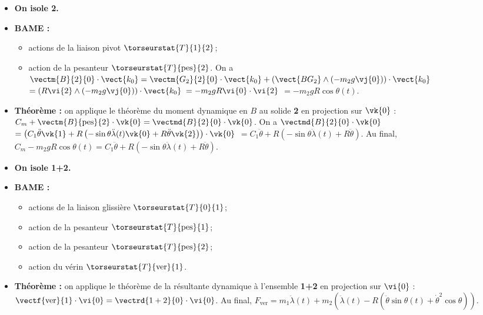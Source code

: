 \begin{corrigebox}
\begin{itemize}
\item \textbf{On isole 2.}
\item \textbf{BAME :}
\begin{itemize}
\item actions de la liaison pivot $\torseurstat{T}{1}{2}$; 
\item action de la pesanteur $\torseurstat{T}{\text{pes}}{2}$. On a $\vectm{B}{2}{0}\cdot \vect{k_0}=\vectm{G_2}{2}{0}\cdot \vect{k_0}+\left(\vect{BG_2}\wedge \left( -m_2 g \vj{0} \right) \right)\cdot \vect{k_0}$ $=\left(R\vi{2}\wedge \left( -m_2 g \vj{0} \right) \right)\cdot \vect{k_0}$
$=-m_2 g R  \vi{0}\cdot \vi{2} $ $=-m_2 g R  \cos\theta(t) $.
\end{itemize}
\item \textbf{Théorème :} on applique le théorème du moment dynamique en $B$ au solide \textbf{2} en projection sur $\vk{0}$ : $C_m+\vectm{B}{\text{pes}}{2}\cdot \vk{0}  = \vectmd{B}{2}{0}\cdot \vk{0}$.
On  a $ \vectmd{B}{2}{0}\cdot \vk{0}$ $=\left(C_1  \ddot{\theta} \vk{1} + R\left( -\sin \theta \ddot{\lambda}(t) \vk{0} 
+ R \ddot{\theta} \vk{2}\right) \right) \cdot \vk{0}$
 $=C_1  \ddot{\theta} + R\left( -\sin \theta \ddot{\lambda}(t) + R \ddot{\theta} \right)  $. Au final, 
 $ C_m-m_2 g R  \cos\theta(t) = C_1  \ddot{\theta} + R\left( -\sin \theta \ddot{\lambda}(t) + R \ddot{\theta} \right)$.
\end{itemize}
\begin{itemize}
\item \textbf{On isole 1+2.}
\item \textbf{BAME :}
\begin{itemize}
\item actions de la liaison glissière $\torseurstat{T}{0}{1}$;
\item action de la pesanteur $\torseurstat{T}{\text{pes}}{1}$;
\item action de la pesanteur $\torseurstat{T}{\text{pes}}{2}$;
\item action du vérin $\torseurstat{T}{\text{ver}}{1}$.
\end{itemize}
\item \textbf{Théorème :} on applique le théorème de la résultante dynamique à l'ensemble \textbf{1+2} en projection sur 
$\vi{0}$ : 
$\vectf{\text{ver}}{1}\cdot \vi{0}  = \vectrd{1+2}{0}\cdot \vi{0}$. Au final, 
$F_{\text{ver}}=m_1\ddot{\lambda}(t)+m_2\left(\ddot{\lambda}(t)- R \left(\ddot{\theta} \sin\theta(t)  + \dot{\theta}^2 \cos\theta \right)\right)$.
\end{itemize}
\end{corrigebox}

